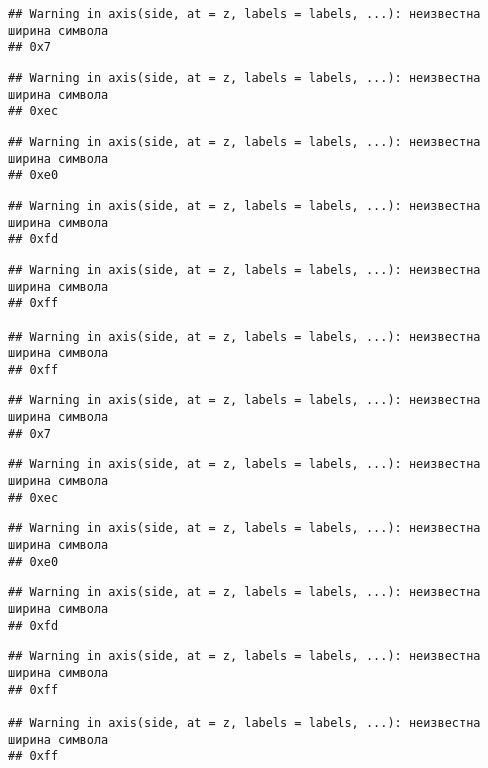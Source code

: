 \documentclass[
]{article}
\begin{document}
\begin{verbatim}
## Warning in axis(side, at = z, labels = labels, ...): неизвестна ширина символа
## 0x7
\end{verbatim}

\begin{verbatim}
## Warning in axis(side, at = z, labels = labels, ...): неизвестна ширина символа
## 0xec
\end{verbatim}

\begin{verbatim}
## Warning in axis(side, at = z, labels = labels, ...): неизвестна ширина символа
## 0xe0
\end{verbatim}

\begin{verbatim}
## Warning in axis(side, at = z, labels = labels, ...): неизвестна ширина символа
## 0xfd
\end{verbatim}

\begin{verbatim}
## Warning in axis(side, at = z, labels = labels, ...): неизвестна ширина символа
## 0xff

## Warning in axis(side, at = z, labels = labels, ...): неизвестна ширина символа
## 0xff
\end{verbatim}

\begin{verbatim}
## Warning in axis(side, at = z, labels = labels, ...): неизвестна ширина символа
## 0x7
\end{verbatim}

\begin{verbatim}
## Warning in axis(side, at = z, labels = labels, ...): неизвестна ширина символа
## 0xec
\end{verbatim}

\begin{verbatim}
## Warning in axis(side, at = z, labels = labels, ...): неизвестна ширина символа
## 0xe0
\end{verbatim}

\begin{verbatim}
## Warning in axis(side, at = z, labels = labels, ...): неизвестна ширина символа
## 0xfd
\end{verbatim}

\begin{verbatim}
## Warning in axis(side, at = z, labels = labels, ...): неизвестна ширина символа
## 0xff

## Warning in axis(side, at = z, labels = labels, ...): неизвестна ширина символа
## 0xff
\end{verbatim}
\end{document}
